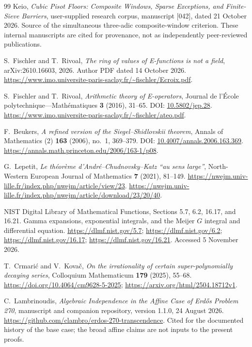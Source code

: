 \documentclass[11pt,a4paper]{article}
\numberwithin{equation}{section}
\theoremstyle{definition}
\theoremstyle{remark}
\begin{document}
\begin{thebibliography}{99}
Keio, \emph{Cubic Pisot Floors: Composite Windows, Sparse
Exceptions, and Finite-Sieve Barriers}, user-supplied
research corpus, manuscript [042], dated 21 October 2026.
Source of the simultaneous three-adic composite-window
criterion. These internal manuscripts are cited for
provenance, not as independently peer-reviewed publications.


S.~Fischler and T.~Rivoal,
\emph{The ring of values of E-functions is not a field},
arXiv:2610.16603, 2026.
Author PDF dated 14 October 2026.
\url{https://www.imo.universite-paris-saclay.fr/~fischler/Ecroix.pdf}.

S.~Fischler and T.~Rivoal,
\emph{Arithmetic theory of E-operators},
Journal de l'\'Ecole polytechnique---Math\'ematiques
\textbf{3} (2016), 31--65.
DOI: \href{https://doi.org/10.5802/jep.28}{10.5802/jep.28}.
\url{https://www.imo.universite-paris-saclay.fr/~fischler/ateo.pdf}.

F.~Beukers,
\emph{A refined version of the Siegel--Shidlovskii theorem},
Annals of Mathematics (2) \textbf{163} (2006), no.~1, 369--379.
DOI: \href{https://doi.org/10.4007/annals.2006.163.369}{10.4007/annals.2006.163.369}.
\url{https://annals.math.princeton.edu/2006/163-1/p08}.

G.~Lepetit,
\emph{Le th\'eor\`eme d'Andr\'e--Chudnovsky--Katz ``au sens large''},
North-Western European Journal of Mathematics \textbf{7} (2021), 81--149.
\url{https://nwejm.univ-lille.fr/index.php/nwejm/article/view/23}.
\url{https://nwejm.univ-lille.fr/index.php/nwejm/article/download/23/20/40}.



NIST Digital Library of Mathematical Functions, Sections 5.7, 6.2,
16.17, and 16.21. Gamma expansions, exponential integrals,
and the Meijer $G$ integral and differential equation.
\url{https://dlmf.nist.gov/5.7}; \url{https://dlmf.nist.gov/6.2};
\url{https://dlmf.nist.gov/16.17}; \url{https://dlmf.nist.gov/16.21}.
Accessed 5 November 2026.

T.~Crmari\'c and V.~Kova\v{c},
\emph{On the irrationality of certain super-polynomially decaying series},
Colloquium Mathematicum \textbf{179} (2025), 55--68.
\url{https://doi.org/10.4064/cm9628-5-2025};
\url{https://arxiv.org/html/2504.18712v1}.

C.~Lambrinoudis,
\emph{Algebraic Independence in the Affine Case of Erd\H{o}s Problem 270},
manuscript and companion repository, version 1.1.0, 24 August 2026.
\url{https://github.com/clambro/erdos-270-transcendence}.
Cited for the documented history of the base case; the broad affine
claims are not inputs to the present proofs.


\end{thebibliography}
\end{document}

